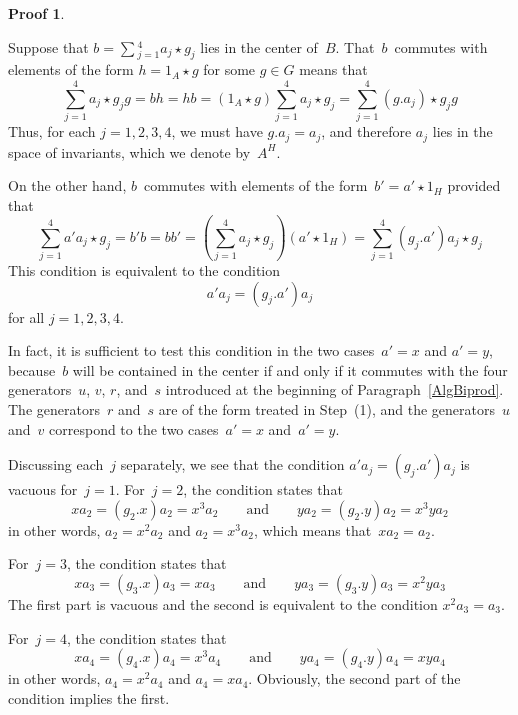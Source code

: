 \documentclass{article}
\newcounter{num}
\newenvironment{pflist}{\begin{list}{(\arabic{num})}{\usecounter{num} \leftmargin0cm \itemindent5pt}}{\end{list}}
\newcounter{num1}
\numberwithin{equation}{section}
\theoremstyle{definition}
\newtheorem*{pf}{Proof}
\theoremstyle{break}
\newcommand{\1}{{(1)}}
\newcommand{\2}{{(2)}}
\newcommand{\3}{{(3)}}
\newcommand{\A}{1_A}
\newcommand{\HH}{1_H}
\begin{document}
\begin{pf}
\begin{pflist}
\item
Suppose that $b = \sum\displaystyle_{j=1}^{4} a_{j} \star g_j$ lies in the center of~$B$. That~$b$~commutes with elements of the form $h = \A \star g$ for some $g \in G$ means that
\[\sum_{j=1}^{4}a_{j}\star g_j g= bh=hb =\left( \A \star g\right)\sum_{j=1}^{4}a_{j}\star g_j = \sum_{j=1}^{4}(g .a_{j})\star g_j g\]
Thus, for each $j = 1,2,3,4$, we must have $g.a_{j} = a_j$, and therefore $a_j$ lies in the space of invariants, which we denote by~$A^H$.

\item
On the other hand, $b$~commutes with elements of the form~$b' = a' \star \HH$ provided that
\[\sum_{j=1}^{4} a' a_{j} \star g_j = b' b = b b' = 
\left(\sum_{j=1}^{4} a_{j} \star g_j \right) \left( a' \star \HH \right) = 
\sum_{j=1}^{4} (g_j.a') a_{j} \star g_j\]
This condition is equivalent to the condition
\begin{equation*}
a' a_j = (g_j.a') a_j
\end{equation*}
for all $j = 1,2,3,4$.

\item
In fact, it is sufficient to test this condition in the two cases~$a'=x$ and \mbox{$a'=y$}, because~$b$ will be contained in the center if and only if it commutes with the four generators~$u$, $v$, $r$, and~$s$ introduced at the beginning of Paragraph~\ref{AlgBiprod}. The generators~$r$ and~$s$ are of the form treated in Step~(1), and the generators~$u$ and~$v$ correspond to the two cases~$a'=x$ and~$a'=y$.

\item
Discussing each~$j$ separately, we see that the condition $a' a_{j} = (g_j .a') a_{j}$ is vacuous for~$j=1$. For~$j=2$, the condition states that
\[x a_2 = (g_2.x) a_2 = x^3 a_2 \qquad \text{and} \qquad y a_2 = (g_2.y) a_2 = x^3 y a_2\]
in other words, $a_2 = x^2 a_2$ and $a_2 = x^3 a_2$, which means that~$x a_2 = a_2$.

\begin{samepage}
For~$j=3$, the condition states that
\[x a_3 = (g_3.x) a_3 = x a_3 \qquad \text{and} \qquad y a_3 = (g_3.y) a_3 = x^2 y a_3\]
The first part is vacuous and the second is equivalent to the condition $x^2 a_3 = a_3$.

\end{samepage}

For~$j=4$, the condition states that
\[x a_4 = (g_4.x) a_4 = x^3 a_4 \qquad \text{and} \qquad y a_4 = (g_4.y) a_4 = x y a_4\]
in other words, $a_4 = x^2 a_4$ and $a_4 = x a_4$. Obviously, the second part of the condition implies the first.


\end{pflist}
\end{pf}
\end{document}
